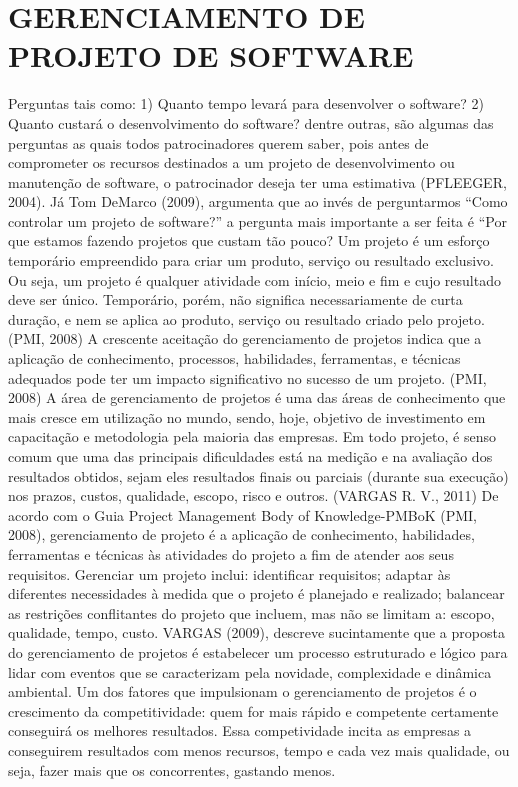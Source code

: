 \chapter*[GERENCIAMENTO DE PROJETO DE SOFTWARE]{GERENCIAMENTO DE PROJETO DE SOFTWARE}

Perguntas tais como: 1) Quanto tempo levará para desenvolver o software? 2) Quanto custará o desenvolvimento do software? dentre outras, são algumas das perguntas as quais todos patrocinadores querem saber, pois antes de comprometer os recursos destinados a um projeto de desenvolvimento ou manutenção de software, o patrocinador deseja ter uma estimativa (PFLEEGER, 2004).
Já Tom DeMarco (2009), argumenta que ao invés de perguntarmos “Como controlar um projeto de software?” a pergunta mais importante a ser feita é “Por que estamos fazendo projetos que custam tão pouco?
Um projeto é um esforço temporário empreendido para criar um produto, serviço ou resultado exclusivo. Ou seja, um projeto é qualquer atividade com início, meio e fim e cujo resultado deve ser único. Temporário, porém, não significa necessariamente de curta duração, e nem se aplica ao produto, serviço ou resultado criado pelo projeto. (PMI, 2008)
A crescente aceitação do gerenciamento de projetos indica que a aplicação de conhecimento, processos, habilidades, ferramentas, e técnicas adequados pode ter um impacto significativo no sucesso de um projeto. (PMI, 2008) A área de gerenciamento de projetos é uma das áreas de conhecimento que mais cresce em utilização no mundo, sendo, hoje, objetivo de investimento em capacitação e metodologia pela maioria das empresas. Em todo projeto, é senso comum que uma das principais dificuldades está na medição e na avaliação dos resultados obtidos, sejam eles resultados finais ou parciais (durante sua execução) nos prazos, custos, qualidade, escopo, risco e outros. (VARGAS R. V., 2011)
De acordo com o Guia Project Management Body of Knowledge-PMBoK (PMI, 2008), gerenciamento de projeto é a aplicação de conhecimento, habilidades, ferramentas e técnicas às atividades do projeto a fim de atender aos seus requisitos. Gerenciar um projeto inclui: identificar requisitos; adaptar às diferentes necessidades à medida que o projeto é planejado e realizado; balancear as restrições conflitantes do projeto que incluem, mas não se limitam a: escopo, qualidade, tempo, custo.
VARGAS (2009), descreve sucintamente que a proposta do gerenciamento de projetos é estabelecer um processo estruturado e lógico para lidar com eventos que se caracterizam pela novidade, complexidade e dinâmica ambiental. Um dos fatores que impulsionam o gerenciamento de projetos é o crescimento da competitividade: quem for mais rápido e competente certamente conseguirá os melhores resultados. Essa competividade incita as empresas a conseguirem resultados com menos recursos, tempo e cada vez mais qualidade, ou seja, fazer mais que os concorrentes, gastando menos.
